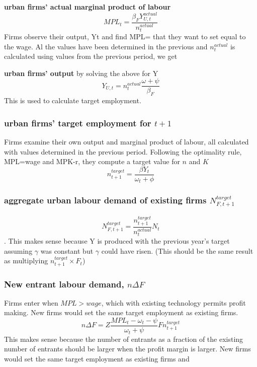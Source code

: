 \textbf{urban firms' actual marginal product of labour}
\[MPL_{t} = \frac{\beta_{F}Y^{actual}_{U,t}}{n_t^{actual}}\] \noindent Firms observe their output, Yt and find  MPL= that they want to set equal to the wage. Al the values have been determined in the previous  and $n^{actual}_t$ is calculated using values from the  previous period, we get

\textbf{urban firms' output} by solving the above for Y
\[Y_{U,t}=  n_t^{actual}\frac{\omega+\psi}{\beta_{F}} \] 
This is used to calculate target employment.


{\color{red}
\subsubsection{urban firms' target employment for $t+1$} Firms examine their own output and marginal product of labour, all calculated with values determined in the previous period. Following the  optimality rule, MPL=wage and MPK-r, they compute a target value for $n$ and $K$
\[ n^{target}_{t+1}= \frac{\beta Y_{t}}{\omega_t + \phi} \]



\subsubsection{aggregate urban labour demand of existing firms $N_{F,t+1}^{target}$} 

\[N_{F,t+1}^{target} = \frac{n^{target}_{t+1}}{n^{actual}_{t}} N_t\].   
This makes sense because Y is produced with the previous year's target assuming  $\gamma$ was constant but  $\gamma$ could have risen. (This should be the same result as  multiplying $n^{target}_{t+1} \times F_{t} $)



\subsubsection{New entrant labour demand,  $n\Delta F$} Firms enter when $MPL > wage$, which with existing technology permits profit making. New firms would set the same target employment as existing firms. 
\[n\Delta F =Z\frac{MPL_t-\omega_t -\psi}{\omega_t +\psi}F n^{target}_{t+1}\]
This makes sense because the number of entrants as a fraction of the existing number of entrants should be larger when the profit margin is larger. New firms would set the same target employment as existing firms and 

}
